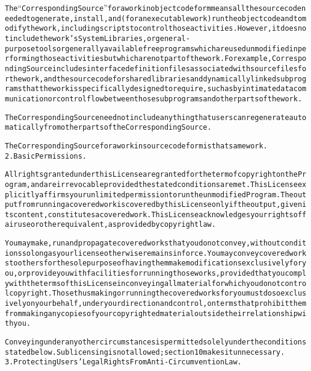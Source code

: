 \begin{alltt}
The “Corresponding Source” for a work in object code form means all the source code needed to generate, install, and (for an executable work) run the object code and to modify the work, including scripts to control those activities. However, it does not include the work's System Libraries, or general-purpose tools or generally available free programs which are used unmodified in performing those activities but which are not part of the work. For example, Corresponding Source includes interface definition files associated with source files for the work, and the source code for shared libraries and dynamically linked subprograms that the work is specifically designed to require, such as by intimate data communication or control flow between those subprograms and other parts of the work.

The Corresponding Source need not include anything that users can regenerate automatically from other parts of the Corresponding Source.

The Corresponding Source for a work in source code form is that same work.
2. Basic Permissions.

All rights granted under this License are granted for the term of copyright on the Program, and are irrevocable provided the stated conditions are met. This License explicitly affirms your unlimited permission to run the unmodified Program. The output from running a covered work is covered by this License only if the output, given its content, constitutes a covered work. This License acknowledges your rights of fair use or other equivalent, as provided by copyright law.

You may make, run and propagate covered works that you do not convey, without conditions so long as your license otherwise remains in force. You may convey covered works to others for the sole purpose of having them make modifications exclusively for you, or provide you with facilities for running those works, provided that you comply with the terms of this License in conveying all material for which you do not control copyright. Those thus making or running the covered works for you must do so exclusively on your behalf, under your direction and control, on terms that prohibit them from making any copies of your copyrighted material outside their relationship with you.

Conveying under any other circumstances is permitted solely under the conditions stated below. Sublicensing is not allowed; section 10 makes it unnecessary.
3. Protecting Users' Legal Rights From Anti-Circumvention Law.


\end{alltt}
